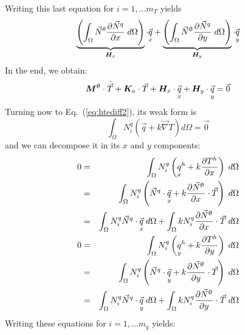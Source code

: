 Writing this last equation for $i=1,...m_T$ yields
\[
\underbrace{\left( \int_\Omega \vec{N}^\theta  \frac{\partial \vec{N}^q}{\partial x} \; d\Omega \right)}_{{\bm H}_x} \cdot\vec{\underset{\tiny x}{q}}+ 
\underbrace{\left( \int_\Omega  \vec{N}^\uptheta \frac{\partial \vec{N}^q}{\partial y}  \;  d\Omega\right)}_{{\bm H}_y} \cdot \vec{\underset{\tiny y}{q}}
\]
In the end, we obtain:
\begin{equation}
{\bm M}^\uptheta \cdot \dot{\vec{T}} + {\bm K}_a \cdot \vec{T} 
+ {\bm H}_x \cdot \vec{\underset{\tiny x}{q}}
+ {\bm H}_y \cdot \vec{\underset{\tiny y}{q}}
=\vec{0} \label{eq:htediff3}
\end{equation}
Turning now to Eq.~(\ref{eq:htediff2}), its weak form is
\[
\int_\Omega N_i^q \left( \vec{q} + k \vec \nabla T \right) d\Omega = \vec{0}
\]
and we can decompose it in its $x$ and $y$ components:
\begin{eqnarray}
0&=&\int_\Omega N_i^q \left( \underset{\tiny x}{q}^h + k  \frac{\partial T^h}{\partial x} \right) \; d\Omega  \nonumber\\
&=& \int_\Omega N_i^q \left( \vec{N}^q \cdot \vec{\underset{\tiny x}{q}} 
+ k  \frac{\partial \vec{N}^\uptheta}{\partial x} \cdot \vec{T} \right) \; d\Omega \nonumber\\ 
&=& \int_\Omega N_i^q \vec{N}^q \cdot \vec{\underset{\tiny x}{q}} \; d\Omega  
+ \int _\Omega k N_i^q   \frac{\partial \vec{N}^\uptheta}{\partial x}\cdot \vec{T} \;  d\Omega \nonumber\\ 
0&=&\int_\Omega N_i^q \left( \underset{\tiny y}{q}^h + k  \frac{\partial T^h}{\partial y} \right) \;  d\Omega \nonumber\\
&=& \int_\Omega N_i^q \left( \vec{N}^q \cdot \vec{\underset{\tiny y}{q}} 
+ k  \frac{\partial \vec{N}^\uptheta}{\partial y} \cdot \vec{T} \right) \;  d\Omega \nonumber\\ 
&=& \int_\Omega N_i^q \vec{N}^q \cdot \vec{\underset{\tiny y}{q}} \; d\Omega
+ \int _\Omega k N_i^q   \frac{\partial \vec{N}^\uptheta}{\partial y} \cdot \vec{T} \;  d\Omega 
\end{eqnarray}
Writing these equations for $i=1,...m_q$ yields:
